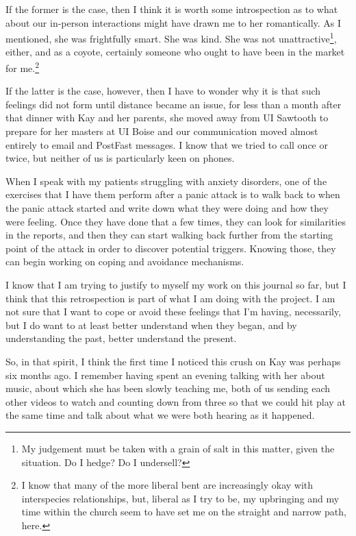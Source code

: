 If the former is the case, then I think it is worth some introspection as to what about our in-person interactions might have drawn me to her romantically. As I mentioned, she was frightfully smart. She was kind. She was not unattractive\footnote{My judgement must be taken with a grain of salt in this matter, given the situation. Do I hedge? Do I undersell?}, either, and as a coyote, certainly someone who ought to have been in the market for me.\footnote{I know that many of the more liberal bent are increasingly okay with interspecies relationships, but, liberal as I try to be, my upbringing and my time within the church seem to have set me on the straight and narrow path, here.}

If the latter is the case, however, then I have to wonder why it is that such feelings did not form until distance became an issue, for less than a month after that dinner with Kay and her parents, she moved away from UI Sawtooth to prepare for her masters at UI Boise and our communication moved almost entirely to email and PostFast messages. I know that we tried to call once or twice, but neither of us is particularly keen on phones.

When I speak with my patients struggling with anxiety disorders, one of the exercises that I have them perform after a panic attack is to walk back to when the panic attack started and write down what they were doing and how they were feeling. Once they have done that a few times, they can look for similarities in the reports, and then they can start walking back further from the starting point of the attack in order to discover potential triggers. Knowing those, they can begin working on coping and avoidance mechanisms.

I know that I am trying to justify to myself my work on this journal so far, but I think that this retrospection is part of what I am doing with the project. I am not sure that I want to cope or avoid these feelings that I'm having, necessarily, but I do want to at least better understand when they began, and by understanding the past, better understand the present.

So, in that spirit, I think the first time I noticed this crush on Kay was perhaps six months ago. I remember having spent an evening talking with her about music, about which she has been slowly teaching me, both of us sending each other videos to watch and counting down from three so that we could hit play at the same time and talk about what we were both hearing as it happened.

